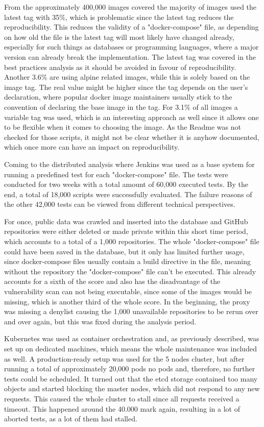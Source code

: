 From the approximately 400,000 images covered the majority of images used the latest tag with 35\%, which is problematic since the latest tag reduces the reproducibility. This reduces the validity of a "docker-compose" file, as depending on how old the file is the latest tag will most likely have changed already, especially for such things as databases or programming languages, where a major version can already break the implementation. The latest tag was covered in the best practices analysis as it should be avoided in favour of reproducibility.
Another 3.6\% are using alpine related images, while this is solely based on the image tag. The real value might be higher since the tag depends on the user's declaration, where popular docker image maintainers usually stick to the convention of declaring the base image in the tag.
For 3.1\% of all images a variable tag was used, which is an interesting approach as well since it allows one to be flexible when it comes to choosing the image. As the Readme was not checked for those scripts, it might not be clear whether it is anyhow documented, which once more can have an impact on reproducibility.

Coming to the distributed analysis where Jenkins was used as a base system for running a predefined test for each "docker-compose" file. The tests were conducted for two weeks with a total amount of 60,000 executed tests. By the end, a total of 18,000 scripts were successfully evaluated. The failure reasons of the other 42,000 tests can be viewed from different technical perspectives.

For once, public data was crawled and inserted into the database and GitHub repositories were either deleted or made private within this short time period, which accounts to a total of a 1,000 repositories. The whole "docker-compose" file could have been saved in the database, but it only has limited further usage, since docker-compose files usually contain a build directive in the file, meaning without the repository the "docker-compose" file can't be executed. This already accounts for a sixth of the score and also has the disadvantage of the vulnerability scan can not being executable, since some of the images would be missing, which is another third of the whole score. In the beginning, the proxy was missing a denylist causing the 1,000 unavailable repositories to be rerun over and over again, but this was fixed during the analysis period.

Kubernetes was used as container orchestration and, as previously described, was set up on dedicated machines, which means the whole maintenance was included as well. A production-ready setup was used for the 5 nodes cluster, but after running a total of approximately 20,000 pods no pods and, therefore, no further tests could be scheduled. It turned out that the etcd storage contained too many objects and started blocking the master nodes, which did not respond to any new requests. This caused the whole cluster to stall since all requests received a timeout. This happened around the 40.000 mark again, resulting in a lot of aborted tests, as a lot of them had stalled.


